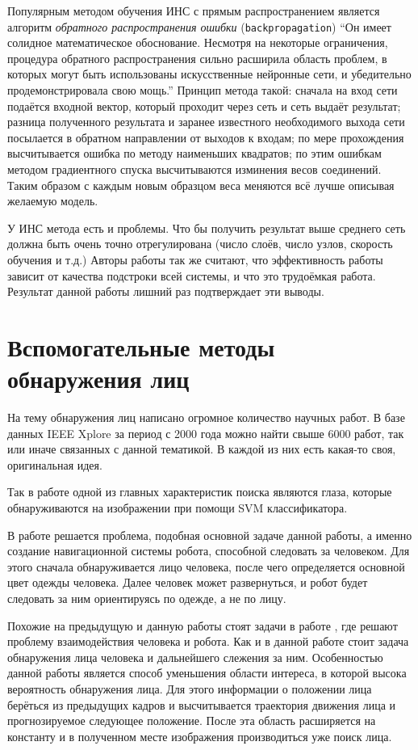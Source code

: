 \documentclass[12pt]{report}
\begin{document}
Популярным методом обучения ИНС с прямым распространением является алгоритм \emph{обратного распространения ошибки} (\texttt{backpropagation}) ``Он имеет солидное математическое обоснование. Несмотря на некоторые ограничения, процедура обратного распространения сильно расширила область проблем, в которых могут быть использованы искусственные нейронные сети, и убедительно продемонстрировала свою мощь.'' \citep{wasserman1989neural}
Принцип метода такой: сначала на вход сети подаётся входной вектор, который проходит через сеть и сеть выдаёт результат; разница полученного результата и заранее известного необходимого выхода сети посылается в обратном направлении от выходов к входам; по мере прохождения высчитывается ошибка по методу наименьших квадратов; по этим ошибкам методом градиентного спуска высчитываются изминения весов соединений. Таким образом с каждым новым образцом веса меняются всё лучше описывая желаемую модель.

 У ИНС метода есть и проблемы. Что бы получить результат выше среднего сеть должна быть очень точно отрегулирована (число слоёв, число узлов, скорость обучения и т.д.) \citep{jee2004eye} Авторы работы \citep{capi2010vision} так же считают, что эффективность работы зависит от качества подстроки всей системы, и что это трудоёмкая работа. Результат данной работы лишний раз подтверждает эти выводы.

\section{Вспомогательные методы обнаружения лиц}

На тему обнаружения лиц написано огромное количество научных работ. В базе данных IEEE Xplore за период с 2000 года можно найти свыше 6000 работ, так или иначе связанных с данной тематикой. В каждой из них есть какая-то своя, оригинальная идея.

Так в работе \citep{jee2004eye} одной из главных характеристик поиска являются глаза, которые обнаруживаются на изображении при помощи SVM классификатора.

В работе \citep{capi2010vision} решается проблема, подобная основной задаче данной работы, а именно создание навигационной системы робота, способной следовать за человеком. Для этого сначала обнаруживается лицо человека, после чего определяется основной цвет одежды человека. Далее человек может развернуться, и робот будет следовать за ним ориентируясь по одежде, а не по лицу.

Похожие на предыдущую и данную работы стоят задачи в работе \citep{luo2007face}, где решают проблему взаимодействия человека и робота. Как и в данной работе стоит задача обнаружения лица человека и дальнейшего слежения за ним. Особенностью данной работы является способ уменьшения области интереса, в которой высока вероятность обнаружения лица. Для этого информации о положении лица берёться из предыдущих кадров и высчитывается траектория движения лица и прогнозируемое следующее положение. После эта область расширяется на константу и в полученном месте изображения производиться уже поиск лица.
\end{document}
